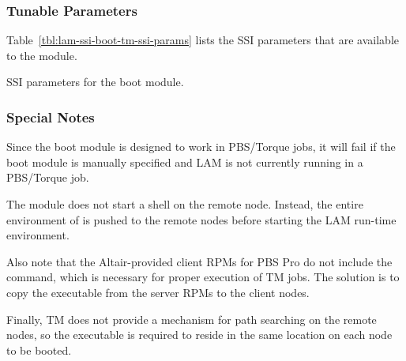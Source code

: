 

\subsubsection{Tunable Parameters}

Table~\ref{tbl:lam-ssi-boot-tm-ssi-params} lists the SSI parameters
that are available to the  module.

\begin{table}[htbp]
  \begin{ssiparamtb}
%
  \end{ssiparamtb}
  \caption{SSI parameters for the  boot module.}
  \label{tbl:lam-ssi-boot-tm-ssi-params}
\end{table}


\subsubsection{Special Notes}

Since the  boot module is designed to work in PBS/Torque
jobs, it will fail if the  boot module is manually specified
and LAM is not currently running in a PBS/Torque job.

The  module does not start a shell on the remote node.
Instead, the entire environment of  is pushed to the
remote nodes before starting the LAM run-time environment.
  
Also note that the Altair-provided client RPMs for PBS Pro do not
include the  command, which is necessary for proper
execution of TM jobs.  The solution is to copy the executable from the
server RPMs to the client nodes.
  
Finally, TM does not provide a mechanism for path searching on the
remote nodes, so the  executable is required to reside in
the same location on each node to be booted.




